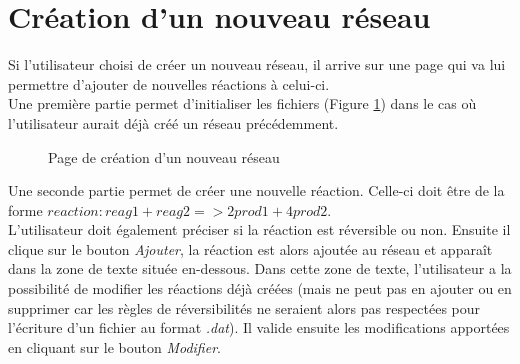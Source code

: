 \section{Création d'un nouveau réseau}

Si l'utilisateur choisi de créer un nouveau réseau, il arrive sur une page qui va lui permettre d'ajouter de nouvelles réactions à celui-ci. \\

Une première partie permet d'initialiser les fichiers (Figure \ref{creation1}) dans le cas où l'utilisateur aurait déjà créé un réseau précédemment.\\

\begin{figure}[!ht]
	\begin{center}
		\caption{Page de création d'un nouveau réseau}
  		\label{creation1}
  	\end{center}	
\end{figure}

Une seconde partie permet de créer une nouvelle réaction. Celle-ci doit être de la forme $reaction : reag1 + reag2 => 2 prod1 + 4 prod2$. \\
L'utilisateur doit également préciser si la réaction est réversible ou non. Ensuite il clique sur le bouton \emph{Ajouter}, la réaction est alors ajoutée au réseau et apparaît dans la zone de texte située en-dessous. Dans cette zone de texte, l'utilisateur a la possibilité de modifier les réactions déjà créées (mais ne peut pas en ajouter ou en supprimer car les règles de réversibilités ne seraient alors pas respectées pour l'écriture d'un fichier au format \emph{.dat}). Il valide ensuite les modifications apportées en cliquant sur le bouton \emph{Modifier}.\\

